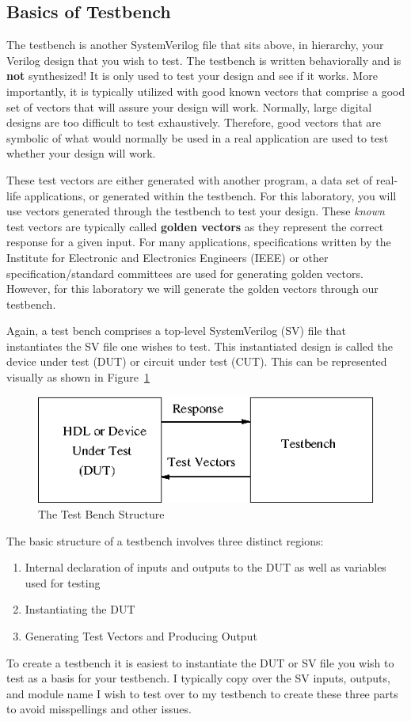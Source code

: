\documentclass{article}
\begin{document}
\subsection{Basics of Testbench}

The testbench is another SystemVerilog file
that sits above, in hierarchy, your Verilog design that you wish to
test.  The testbench is written behaviorally and is \textbf{not}
synthesized!
It is only used to test your design and see if it works.  More
importantly, it is typically utilized with good known vectors that
comprise a good set of vectors that will assure your design will
work.  Normally, large digital designs are too difficult to test
exhaustively.  Therefore, good vectors that are symbolic of what would
normally be used in a real application are used to test whether your
design will work.

These test vectors are either generated with another program, a data
set of real-life applications, or generated within the testbench.  For
this laboratory, you will use vectors generated through the testbench
to test your design.  These \textit{known} test vectors are typically called
\textbf{golden vectors} as they represent the correct response 
for a given input.  For many applications,
specifications written by the Institute for Electronic and Electronics
Engineers (IEEE) or other specification/standard committees are used for
generating golden vectors.  However, for this laboratory we will
generate the golden vectors through our testbench.

Again, a test bench comprises a top-level SystemVerilog (SV) file that
instantiates the SV file one wishes to test.  This instantiated
design is called the device under test (DUT) or circuit under test
(CUT).  This can be represented visually as shown in Figure~\ref{tb.fig}
\begin{figure}
  \centering
  \includegraphics[scale=0.5]{tb.png}
  \caption{The Test Bench Structure}
  \label{tb.fig}
\end{figure}

The basic structure of a testbench involves three distinct regions:
\begin{enumerate}
\item Internal declaration of inputs and outputs to the DUT as well as
  variables used for testing
\item Instantiating the DUT
\item Generating Test Vectors and Producing Output
\end{enumerate}
To create a testbench it is easiest to
instantiate the DUT or SV file you wish
to test as a basis for your testbench.  I typically copy over the SV
inputs, outputs, and module name I wish to test over to my testbench to create these
three parts to avoid misspellings and other issues.
\end{document}
